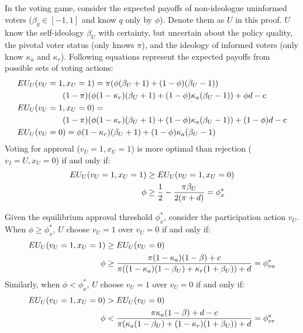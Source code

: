 \par In the voting game, consider the expected payoffs of non-ideologue uninformed voters ($\beta_g \in [-1,1]$ and know $q$ only by $\phi$). Denote them as $U$ in this proof. $U$ know the self-ideology $\beta_U$ with certainty, but uncertain about the policy quality, the pivotal voter status (only knows $\pi$), and the ideology of informed voters (only know $\kappa_a$ and $\kappa_r$). Following equations represent the expected payoffs from possible sets of voting actions:
\begin{align*}
EU_U(v_U=1&, x_U=1) = 
\pi (\phi (\beta_U + 1) + (1-\phi) (\beta_U - 1)) \\
&(1-\pi) (\phi (1-\kappa_{r}) (\beta_U + 1) + (1-\phi ) \kappa_{a} (\beta_U - 1)) + \phi d - c \\
EU_U(v_U=1& ,x_U=0) = \notag \\
&(1-\pi) (\phi (1-\kappa_{r}) (\beta_U+1) + (1-\phi) \kappa_{a} (\beta_U - 1))+ (1-\phi) d - c \\
EU_U(v_U=0&) = \phi (1-\kappa_{r}) (\beta_U+1) + (1-\phi) \kappa_{a} (\beta_U - 1)
\end{align*}
\noindent Voting for approval ($v_U=1,x_U=1$) is more optimal than rejection ($v_I=U,x_U=0$) if and only if:
\begin{align*}
EU_U(v_U=1, x_U=1) &\geq EU_U(v_U=1, x_U=0) \notag \\
\phi &\geq \frac{1}{2} - \frac{\pi \beta_U}{2(\pi + d)} = \phi^*_x
\end{align*}

\par Given the equilibrium approval threshold $\phi^*_x$, consider the participation action $v_U$. When $\phi \geq \phi^*_x$, $U$ choose $v_U=1$ over $v_U=0$ if and only if:
\begin{align*}
EU_U(v_U=1, x_U=1) &\geq EU_U(v_U=0) \notag \\
\phi &\geq \frac{\pi (1- \kappa_{a}) (1-\beta) + c}{\pi ((1 - \kappa_{a}) (1-\beta_U) + \kappa_{r} (1+\beta_U)) + d} = \phi^*_{va} 
\end{align*}
\noindent Similarly, when $\phi < \phi^*_x$, $U$ choose $v_U=1$ over $v_U=0$ if and only if: 
\begin{align*}
EU_U(v_U=1, x_U=0) &> EU_U(v_U=0) \notag \\
\phi &< \frac{\pi \kappa_{a} (1-\beta) + d - c}{\pi ( \kappa_{a} (1-\beta_U) + (1-\kappa_{r}) (1+\beta_U) ) + d} = \phi^*_{vr} 
\end{align*}

